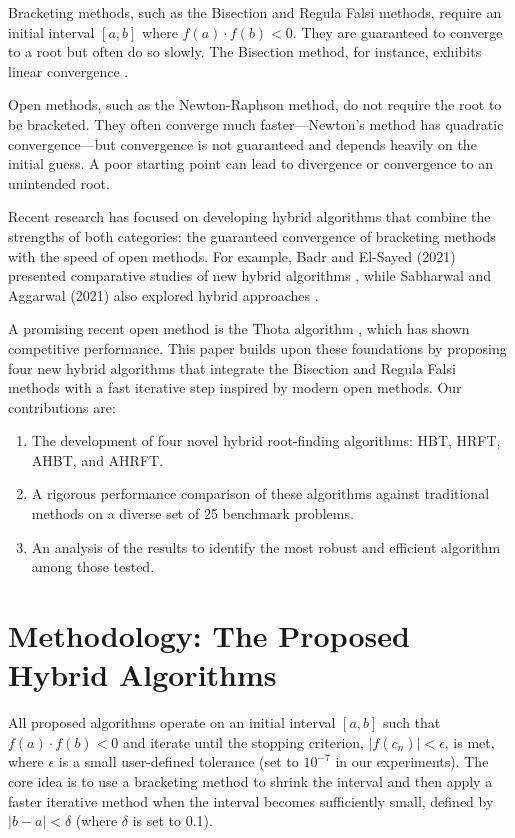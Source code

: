 \documentclass[reprint, amsmath, amssymb, aps, prl]{revtex4-2}
\begin{document}
Bracketing methods, such as the Bisection and Regula Falsi methods, require an initial interval $[a, b]$ where $f(a) \cdot f(b) < 0$. They are guaranteed to converge to a root but often do so slowly. The Bisection method, for instance, exhibits linear convergence \cite{chapra2015numerical}.

Open methods, such as the Newton-Raphson method, do not require the root to be bracketed. They often converge much faster—Newton's method has quadratic convergence—but convergence is not guaranteed and depends heavily on the initial guess. A poor starting point can lead to divergence or convergence to an unintended root.

Recent research has focused on developing hybrid algorithms that combine the strengths of both categories: the guaranteed convergence of bracketing methods with the speed of open methods. For example, Badr and El-Sayed (2021) presented comparative studies of new hybrid algorithms \cite{badr2021comparative}, while Sabharwal and Aggarwal (2021) also explored hybrid approaches \cite{sabharwal2021hybrid}.

A promising recent open method is the Thota algorithm \cite{thota2019trigonometrical}, which has shown competitive performance. This paper builds upon these foundations by proposing four new hybrid algorithms that integrate the Bisection and Regula Falsi methods with a fast iterative step inspired by modern open methods. Our contributions are:
\begin{enumerate}
    \item The development of four novel hybrid root-finding algorithms: HBT, HRFT, AHBT, and AHRFT.
    \item A rigorous performance comparison of these algorithms against traditional methods on a diverse set of 25 benchmark problems.
    \item An analysis of the results to identify the most robust and efficient algorithm among those tested.
\end{enumerate}

\section{Methodology: The Proposed Hybrid Algorithms}
All proposed algorithms operate on an initial interval $[a, b]$ such that $f(a) \cdot f(b) < 0$ and iterate until the stopping criterion, $|f(c_n)| < \epsilon$, is met, where $\epsilon$ is a small user-defined tolerance (set to $10^{-7}$ in our experiments). The core idea is to use a bracketing method to shrink the interval and then apply a faster iterative method when the interval becomes sufficiently small, defined by $|b - a| < \delta$ (where $\delta$ is set to 0.1).
\end{document}
